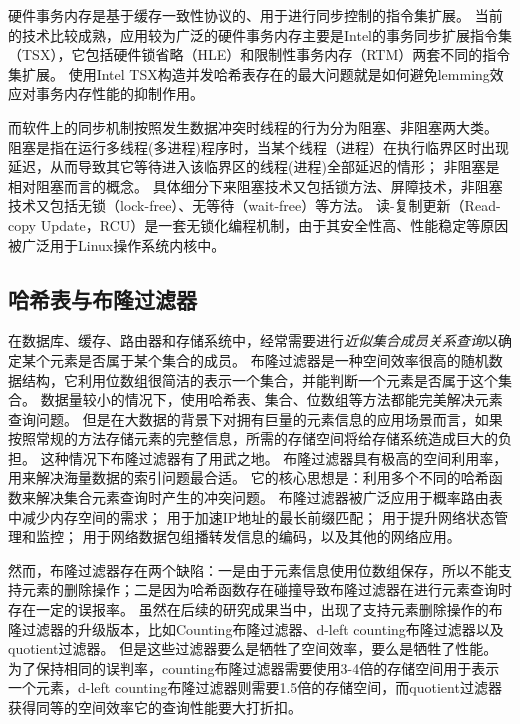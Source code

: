 硬件事务内存是基于缓存一致性协议的、用于进行同步控制的指令集扩展。
当前的技术比较成熟，应用较为广泛的硬件事务内存主要是Intel的事务同步扩展指令集（TSX）\cite{tsx}，它包括硬件锁省略（HLE）和限制性事务内存（RTM）两套不同的指令集扩展。
使用Intel TSX构造并发哈希表存在的最大问题就是如何避免lemming效应对事务内存性能的抑制作用。

而软件上的同步机制按照发生数据冲突时线程的行为分为阻塞、非阻塞两大类。
阻塞是指在运行多线程(多进程)程序时，当某个线程（进程）在执行临界区时出现延迟，从而导致其它等待进入该临界区的线程(进程)全部延迟的情形；
非阻塞是相对阻塞而言的概念。
具体细分下来阻塞技术又包括锁方法、屏障技术，非阻塞技术又包括无锁（lock-free）、无等待（wait-free）等方法。
读-复制更新（Read-copy Update，RCU）是一套无锁化编程机制，由于其安全性高、性能稳定等原因被广泛用于Linux操作系统内核中\cite{mckenney2003kernel,mckenney2004scaling,mckenney2013rcu}。

\subsection{哈希表与布隆过滤器}

在数据库、缓存、路由器和存储系统中，经常需要进行\textit{近似集合成员关系查询}以确定某个元素是否属于某个集合的成员。
布隆过滤器是一种空间效率很高的随机数据结构，它利用位数组很简洁的表示一个集合，并能判断一个元素是否属于这个集合。
数据量较小的情况下，使用哈希表、集合、位数组等方法都能完美解决元素查询问题。
但是在大数据的背景下对拥有巨量的元素信息的应用场景而言，如果按照常规的方法存储元素的完整信息，所需的存储空间将给存储系统造成巨大的负担。
这种情况下布隆过滤器有了用武之地。
布隆过滤器具有极高的空间利用率，用来解决海量数据的索引问题最合适。
它的核心思想是：利用多个不同的哈希函数来解决集合元素查询时产生的冲突问题。
布隆过滤器被广泛应用于概率路由表中减少内存空间的需求\cite{yu2009buffalo}；
用于加速IP地址的最长前缀匹配\cite{dharmapurikar2003longest}；
用于提升网络状态管理和监控\cite{bonomi2006beyond,song2005fast}；
用于网络数据包组播转发信息的编码\cite{jokela2009lipsin}，以及其他的网络应用\cite{broder2004network}。

然而，布隆过滤器存在两个缺陷：一是由于元素信息使用位数组保存，所以不能支持元素的删除操作；二是因为哈希函数存在碰撞导致布隆过滤器在进行元素查询时存在一定的误报率。
虽然在后续的研究成果当中，出现了支持元素删除操作的布隆过滤器的升级版本，比如Counting布隆过滤器\cite{fan2000summary}、d-left counting布隆过滤器\cite{bonomi2006improved}以及quotient过滤器\cite{bender2012don}。
但是这些过滤器要么是牺牲了空间效率，要么是牺牲了性能。
为了保持相同的误判率，counting布隆过滤器需要使用3-4倍的存储空间用于表示一个元素，d-left counting布隆过滤器则需要1.5倍的存储空间，而quotient过滤器获得同等的空间效率它的查询性能要大打折扣。

